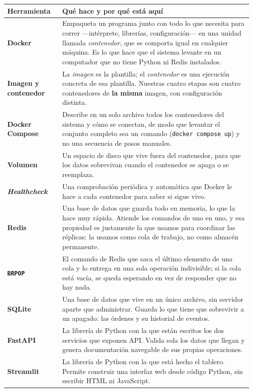 \documentclass[12pt,a4paper]{article}
\begin{document}
\begin{table}[H]
\centering
\footnotesize
\begin{tabular}{@{}L{3.05cm} L{12.15cm}@{}}
\toprule
\textbf{Herramienta} & \textbf{Qué hace y por qué está aquí} \\
\midrule
\textbf{Docker} &
Empaqueta un programa junto con todo lo que necesita para correr —intérprete,
librerías, configuración— en una unidad llamada \emph{contenedor}, que se
comporta igual en cualquier máquina. Es lo que hace que el sistema levante en
un computador que no tiene Python ni Redis instalados. \\
\addlinespace[2pt]
\textbf{Imagen y contenedor} &
La \emph{imagen} es la plantilla; el \emph{contenedor} es una ejecución
concreta de esa plantilla. Nuestras cuatro etapas son cuatro contenedores de
\textbf{la misma} imagen, con configuración distinta. \\
\addlinespace[2pt]
\textbf{Docker Compose} &
Describe en un solo archivo todos los contenedores del sistema y cómo se
conectan, de modo que levantar el conjunto completo sea un comando
(\texttt{docker compose up}) y no una secuencia de pasos manuales. \\
\addlinespace[2pt]
\textbf{Volumen} &
Un espacio de disco que vive fuera del contenedor, para que los datos
sobrevivan cuando el contenedor se apaga o se reemplaza. \\
\addlinespace[2pt]
\textbf{\emph{Healthcheck}} &
Una comprobación periódica y automática que Docker le hace a cada contenedor
para saber si sigue vivo. \\
\addlinespace[2pt]
\textbf{Redis} \cite{redis} &
Una base de datos que guarda todo en memoria, lo que la hace muy rápida.
Atiende los comandos de uno en uno, y esa propiedad es justamente la que
usamos para coordinar las réplicas: la usamos como cola de trabajo, no como
almacén permanente. \\
\addlinespace[2pt]
\textbf{\texttt{BRPOP}} &
El comando de Redis que saca el último elemento de una cola y lo entrega en
una sola operación indivisible; si la cola está vacía, se queda esperando en
vez de responder que no hay nada. \\
\addlinespace[2pt]
\textbf{SQLite} &
Una base de datos que vive en un único archivo, sin servidor aparte que
administrar. Guarda lo que tiene que sobrevivir a un apagado: las órdenes y su
historial de eventos. \\
\addlinespace[2pt]
\textbf{FastAPI} &
La librería de Python con la que están escritos los dos servicios que exponen
API. Valida sola los datos que llegan y genera documentación navegable de sus
propias operaciones. \\
\addlinespace[2pt]
\textbf{Streamlit} &
La librería de Python con la que está hecho el tablero. Permite construir una
interfaz web desde código Python, sin escribir HTML ni JavaScript. \\
\bottomrule
\end{tabular}
\end{table}
\end{document}
